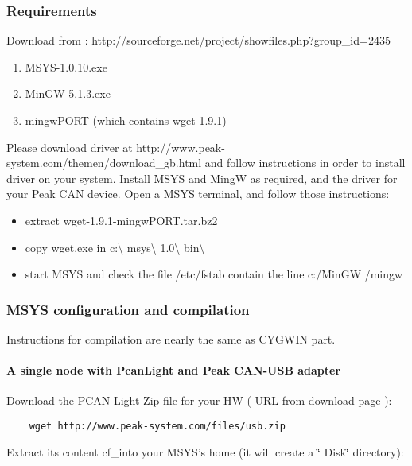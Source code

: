 \documentclass[12pt,english,a4paper]{book}
\begin{document}
\subsubsection{Requirements}

Download from : http://sourceforge.net/project/showfiles.php?group\_id=2435

\begin{enumerate}
\item MSYS-1.0.10.exe 
\item MinGW-5.1.3.exe 
\item mingwPORT (which contains wget-1.9.1) 
\end{enumerate}
Please download driver at http://www.peak-system.com/themen/download\_gb.html
and follow instructions in order to install driver on your system.
Install MSYS and MingW as required, and the driver for your Peak CAN
device. Open a MSYS terminal, and follow those instructions:\\


\begin{itemize}
\item extract wget-1.9.1-mingwPORT.tar.bz2 
\item copy wget.exe in c:\textbackslash{} msys\textbackslash{} 1.0\textbackslash{}
bin\textbackslash{} 
\item start MSYS and check the file /etc/fstab contain the line c:/MinGW
/mingw 
\end{itemize}

\subsubsection{MSYS configuration and compilation}

Instructions for compilation are nearly the same as CYGWIN part.


\paragraph{A single node with PcanLight and Peak CAN-USB adapter}

Download the PCAN-Light Zip file for your HW ( URL from download page
):

\begin{verbatim}
	wget http://www.peak-system.com/files/usb.zip
\end{verbatim}

Extract its content cf_into your MSYS's home (it will create a \char`\"{}
Disk\char`\"{} directory):
\end{document}
